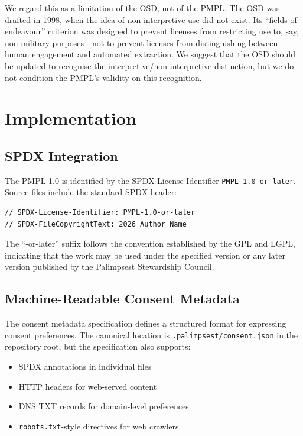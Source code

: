 \documentclass[11pt,twocolumn]{article}
\begin{document}
We regard this as a limitation of the OSD, not of the PMPL. The OSD was
drafted in 1998, when the idea of non-interpretive use did not exist.
Its ``fields of endeavour'' criterion was designed to prevent licenses
from restricting use to, say, non-military purposes---not to prevent
licenses from distinguishing between human engagement and automated
extraction. We suggest that the OSD should be updated to recognise the
interpretive/non-interpretive distinction, but we do not condition the
PMPL's validity on this recognition.

\section{Implementation}
\label{sec:implementation}

\subsection{SPDX Integration}

The PMPL-1.0 is identified by the SPDX License Identifier
\texttt{PMPL-1.0-or-later}. Source files include the standard SPDX
header:

\begin{lstlisting}
// SPDX-License-Identifier: PMPL-1.0-or-later
// SPDX-FileCopyrightText: 2026 Author Name
\end{lstlisting}

The ``-or-later'' suffix follows the convention established by the GPL
and LGPL, indicating that the work may be used under the specified
version or any later version published by the Palimpsest Stewardship
Council.

\subsection{Machine-Readable Consent Metadata}

The consent metadata specification defines a structured format for
expressing consent preferences. The canonical location is
\texttt{.palimpsest/consent.json} in the repository root, but the
specification also supports:

\begin{itemize}
    \item SPDX annotations in individual files
    \item HTTP headers for web-served content
    \item DNS TXT records for domain-level preferences
    \item \texttt{robots.txt}-style directives for web crawlers
\end{itemize}
\end{document}
